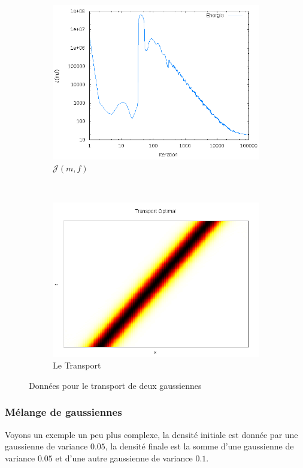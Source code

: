 \documentclass[a4paper,12pt]{article}
\begin{document}
\begin{figure}[!h]
	\begin{subfigure}[b]{0.48\linewidth}
	\includegraphics[width=\textwidth]{img/1DGaussian100x100/energie.png}
	\caption{$\mathcal{J}(m,f)$}
	\end{subfigure}
	~
	\begin{subfigure}[b]{0.48\linewidth}
	\includegraphics[width=\textwidth]{img/1DGaussian100x100/transport.png}
	\caption{Le Transport}
	\end{subfigure}	
	\caption{Données pour le transport de deux gaussiennes}
\end{figure}

\newpage
\subsubsection{Mélange de gaussiennes}
Voyons un exemple un peu plus complexe, la densité initiale est donnée par une gaussienne de variance $0.05$, la densité finale est la somme d'une gaussienne de variance $0.05$ et d'une autre gaussienne de variance $0.1$. 
\end{document}
